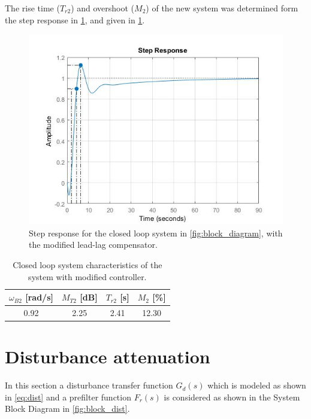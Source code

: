 \documentclass[a4paper]{article}
\begin{document}
The rise time ($T_{r2}$) and overshoot ($M_2$) of the new system was determined form the step response in \cref{fig:step_response_ph50}, and given in \cref{tb:response_ph50}.

\begin{figure}[!ht]
	\begin{center}
		\includegraphics[width=.8\linewidth]{step_response_ph50}
	\end{center}
	\caption{Step response for the closed loop system in \cref{fig:block_diagram}, with the modified lead-lag compensator.}
	\label{fig:step_response_ph50}
\end{figure}

\begin{table}[!ht]
\begin{center}
	\begin{tabular}{|c|c|c|c|}
		\hline
		$\omega_{B2}$ [rad/s] & $M_{T2}$ [dB] & $T_{r2}$ [s] & $M_2$ [\%] \\
		\hline
		 0.92 & 2.25 & 2.41 & 12.30 \\
		\hline
	\end{tabular}
\end{center}
\caption{Closed loop system characteristics of the system with modified controller.}
\label{tb:response_ph50}
\end{table}

\section{Disturbance attenuation}

In this section a disturbance transfer function $G_d(s)$  which is modeled as shown in \cref{eq:dist} and a prefilter function $F_r(s)$ is considered as shown in the System Block Diagram in \cref{fig:block_dist}.
\end{document}
